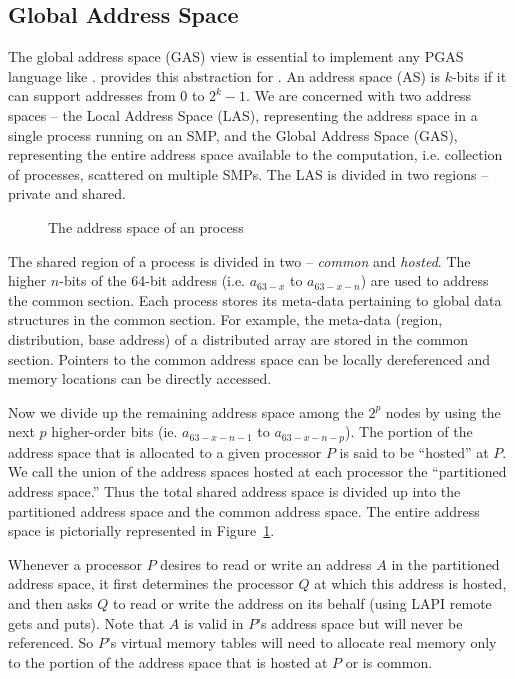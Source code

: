 \subsection {Global Address Space}
\label{sec:gas}

The global address space (GAS) view is essential to implement any PGAS
language like \Xten{}.\Xtenlib{} provides this abstraction for \Xten{}.
An address space (AS) is $k$-bits if it can support addresses from $0$
to $2^k-1$. We are concerned with two address spaces -- the Local
Address Space (LAS), representing the address space in a single process
running on an SMP, and the Global Address Space (GAS), representing the
entire address space available to the computation, i.e. collection of
processes, scattered on multiple SMPs. The LAS is divided in two regions
-- private and shared.


\begin{figure}
\center
\caption{\Xten{} The address space of an \Xtenlib{} process}
\label{fig:as_layout}
\end{figure}

The shared region of a process is divided in two -- {\em common} and
{\em hosted}. The higher $n$-bits of the 64-bit address (i.e. $a_{63-x}$
to $a_{63-x-n}$) are used to address the common section. Each process
stores its meta-data pertaining to global data structures in the common
section. For example, the meta-data (region, distribution, base address)
of a distributed array are stored in the common section. Pointers to the
common address space can be locally dereferenced and memory locations
can be directly accessed.

Now we divide up the remaining address space among the $2^p$ nodes by
using the next $p$ higher-order bits (ie. $a_{63-x-n-1}$ to
$a_{63-x-n-p}$). The portion of the address space that is allocated to a
given processor $P$ is said to be ``hosted'' at $P$. We call the union
of the address spaces hosted at each processor the ``partitioned address
space.'' Thus the total shared address space is divided up into the
partitioned address space and the common address space. The entire
address space is pictorially represented in Figure~\ref{fig:as_layout}. 

Whenever a processor $P$ desires to read or write an address  $A$ in the 
partitioned address space, it first determines the processor $Q$ at which 
this address is hosted, and then asks $Q$ to read or write the address on 
its behalf (using LAPI remote gets and puts). Note that  $A$ is valid in 
$P$'s address space but will never be referenced. So $P$'s virtual memory 
tables will need to allocate real memory only to the portion of the 
address space that is hosted at $P$ or is common.

